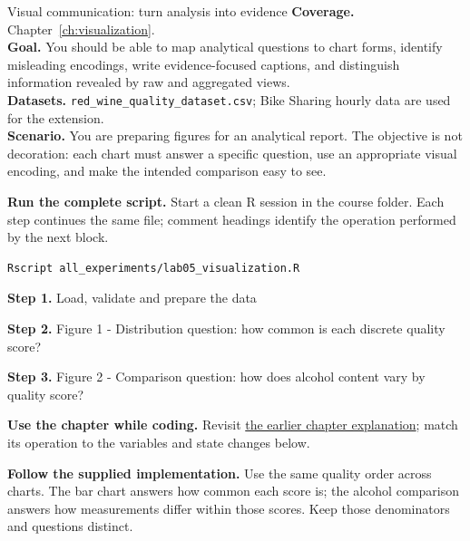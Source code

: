 
\begin{labproject}{Visual communication: turn analysis into evidence}
\textbf{Coverage.} Chapter~\ref{ch:visualization}.\\
\textbf{Goal.} You should be able to map analytical questions to chart forms, identify misleading encodings, write evidence-focused captions, and distinguish information revealed by raw and aggregated views.\\
\textbf{Datasets.} \texttt{red\_wine\_quality\_dataset.csv}; Bike Sharing hourly data are used for the extension.\\
\textbf{Scenario.} You are preparing figures for an analytical report. The objective is not decoration: each chart must answer a specific question, use an appropriate visual encoding, and make the intended comparison easy to see.



\textbf{Run the complete script.} Start a clean R session in the course folder. Each step continues the same file; comment headings identify the operation performed by the next block.
\begin{lstlisting}[style=utpterminal]
Rscript all_experiments/lab05_visualization.R
\end{lstlisting}

\noindent\textbf{Step 1.} Load, validate and prepare the data


\noindent\textbf{Step 2.} Figure 1 - Distribution question: how common is each discrete quality score?



\noindent\textbf{Step 3.} Figure 2 - Comparison question: how does alcohol content vary by quality score?


\textbf{Use the chapter while coding.} Revisit \hyperref[ch:visualization]{the earlier chapter explanation}; match its operation to the variables and state changes below.

\textbf{Follow the supplied implementation.} Use the same quality order across charts. The bar chart answers how common each score is; the alcohol comparison answers how measurements differ within those scores. Keep those denominators and questions distinct.



\end{labproject}
